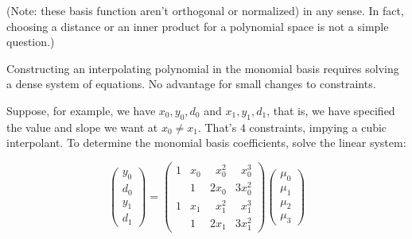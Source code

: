 (Note: these basis function aren't orthogonal or normalized)
in any
sense. In fact, choosing a distance or an inner product for
a polynomial space is not a simple question.)

Constructing an interpolating polynomial in the monomial basis
requires solving a dense system of equations. 
No advantage for small changes to constraints.

Suppose, for example, we have $x_0,y_0,d_0$ and
$x_1,y_1,d_1$, that is, we have specified the value and slope we
want at $x_0 \neq x_1$.
That's $4$ constraints, impying a cubic interpolant.
To determine the monomial basis coefficients,
solve the linear system:

\begin{equation}
\begin{pmatrix}
y_0 \\ d_0 \\ y_1 \\ d_1
\end{pmatrix}
=
\begin{pmatrix}
1 & x_0 & \phantom{2} x_0^2 & \phantom{3} x_0^3 \\
  & 1   & 2 x_0 & 3 x_0^2 \\
1 & x_1 & \phantom{2} x_1^2 & \phantom{3} x_1^3 \\
  & 1   & 2 x_1 & 3 x_1^2 
\end{pmatrix}
\begin{pmatrix}
\mu_0 \\ \mu_1 \\ \mu_2 \\ \mu_3
\end{pmatrix}
\end{equation}

